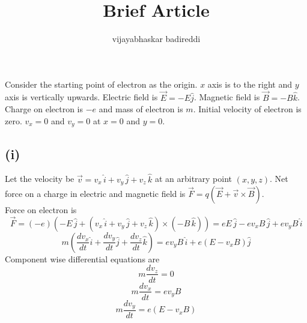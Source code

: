 \documentclass[12pt]{article}
\title{Brief Article}
\author{vijayabhaskar badireddi}
\begin{document}
Consider the starting point of electron as the origin. $x$ axis is to the right and $y$ axis is vertically upwards.
Electric field is $\vec{E}=-E\hat{j}$. Magnetic field is $\vec{B}=-B\hat{k}$.
Charge on electron is $-e$ and mass of electron is $m$.
Initial velocity of electron is zero. $v_x=0$ and $v_y=0$ at $x=0$ and $y=0$.
\subsection*{(i)}
Let the velocity be $\vec{v}=v_x\,\hat{i}+v_y\,\hat{j}+v_z\,\hat{k}$ at an arbitrary point $(x,y,z)$.
Net force on a charge in electric and magnetic field is $\vec{F}=q(\vec{E}+\vec{v}\times\vec{B})$.\\
Force on electron is $$\vec{F}=(-e)(-E\,\hat{j}+(v_x\,\hat{i}+v_y\,\hat{j}+v_z\,\hat{k})\times(-B\,\hat{k}))=eE\,\hat{j}-ev_xB\,\hat{j}+ev_yB\,\hat{i}$$
$$m\left(\frac{dv_x}{dt}\hat{i}+\frac{dv_y}{dt}\hat{j}+\frac{dv_z}{dt}\hat{k} \right )=ev_yB\,\hat{i}+e(E-v_xB)\hat{j}$$
Component wise differential equations are 
\[m\frac{dv_z}{dt}=0\]
\[\boxed{m\frac{dv_x}{dt}=ev_yB}\]
\[\boxed{m\frac{dv_y}{dt}=e(E-v_xB)}\]
\end{document}
